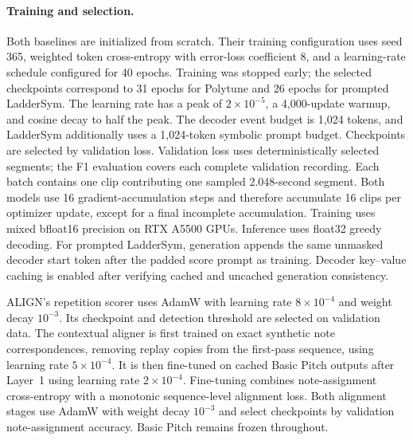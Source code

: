 \paragraph{Training and selection.}
Both baselines are initialized from scratch. Their training configuration
uses seed 365, weighted token cross-entropy with error-loss coefficient 8,
and a learning-rate schedule configured for 40 epochs. Training was stopped
early; the selected checkpoints correspond to 31 epochs for Polytune and
26 epochs for prompted LadderSym. The learning rate has a peak of $2\times10^{-5}$, a
4,000-update warmup, and cosine decay to half the peak. The decoder event
budget is 1,024 tokens, and LadderSym additionally uses a 1,024-token
symbolic prompt budget. Checkpoints are selected by validation loss.
Validation loss uses deterministically selected segments; the F1 evaluation
covers each complete validation recording.
Each batch contains one clip contributing one sampled 2.048-second segment.
Both models use 16 gradient-accumulation steps and therefore accumulate
16 clips per optimizer update, except for a final incomplete
accumulation. Training uses mixed bfloat16 precision on RTX A5500 GPUs.
Inference uses float32 greedy decoding. For prompted LadderSym, generation
appends the same unmasked decoder start token after the padded score prompt
as training. Decoder key--value caching is enabled after verifying cached
and uncached generation consistency.

ALIGN's repetition scorer uses AdamW with learning rate $8\times10^{-4}$
and weight decay $10^{-3}$. Its checkpoint and detection threshold are
selected on validation data. The contextual aligner is first trained on
exact synthetic note correspondences, removing replay copies from the
first-pass sequence, using learning rate $5\times10^{-4}$. It is then
fine-tuned on cached Basic Pitch outputs after Layer~1 using learning rate
$2\times10^{-4}$. Fine-tuning combines note-assignment cross-entropy with
a monotonic sequence-level alignment loss. Both alignment stages use
AdamW with weight decay $10^{-3}$ and select checkpoints by validation
note-assignment accuracy. Basic Pitch remains frozen throughout.

